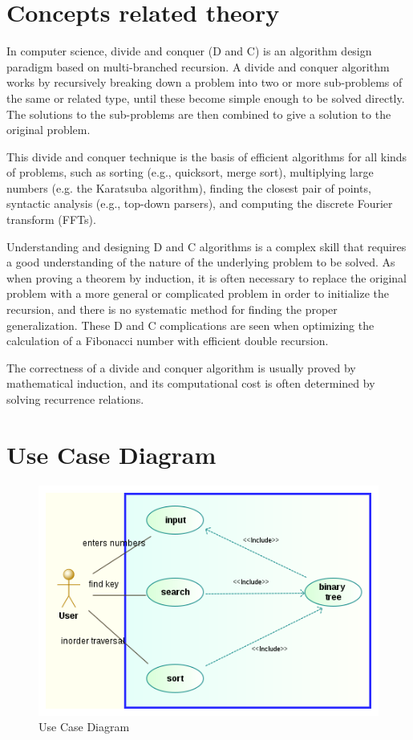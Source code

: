 \documentclass[10pt,a4paper]{article}
\begin{document}
\newpage
\section{Concepts related theory}
In computer science, divide and conquer (D and C) is an algorithm design paradigm based on multi-branched recursion. A divide and conquer algorithm works by recursively breaking down a problem into two or more sub-problems of the same or related type, until these become simple enough to be solved directly. The solutions to the sub-problems are then combined to give a solution to the original problem.

This divide and conquer technique is the basis of efficient algorithms for all kinds of problems, such as sorting (e.g., quicksort, merge sort), multiplying large numbers (e.g. the Karatsuba algorithm), finding the closest pair of points, syntactic analysis (e.g., top-down parsers), and computing the discrete Fourier transform (FFTs).

Understanding and designing D and C algorithms is a complex skill that requires a good understanding of the nature of the underlying problem to be solved. As when proving a theorem by induction, it is often necessary to replace the original problem with a more general or complicated problem in order to initialize the recursion, and there is no systematic method for finding the proper generalization. These D and C complications are seen when optimizing the calculation of a Fibonacci number with efficient double recursion.

The correctness of a divide and conquer algorithm is usually proved by mathematical induction, and its computational cost is often determined by solving recurrence relations.

\section{Use Case Diagram}
	\begin{figure}[h!]
		\centering
		\includegraphics[scale=0.50]{use_case_diagram.png}
		\caption{Use Case Diagram}
		\label{Use Case Diagram}
	\end{figure}
\end{document}
